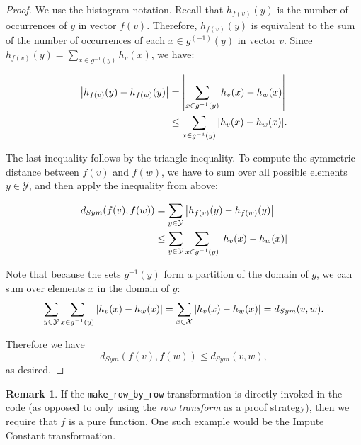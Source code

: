 \documentclass[11pt,a4paper]{article}
\theoremstyle{definition}
\newtheorem{remark}[theorem]{Remark}
\newtheorem{definition}[theorem]{Definition}
\newcommand{\grace}[1]{{ {\color{purple}{(grace)~#1}}}}
\begin{document}
\begin{proof}
    We use the histogram notation. Recall that $h_{f(v)}(y)$ is the number of occurrences of $y$ in vector $f(v)$. Therefore, $h_{f(v)}(y)$ is equivalent to the sum of the number of occurrences of each $x \in g^{(-1)}(y)$ in vector $v$. Since $h_{f(v)}(y) = \sum_{x \in g^{-1}(y)} h_v(x)$, we have:

\begin{align*}
    \abs{h_{f(v)}(y) - h_{f(w)}(y)} &= \abs{\sum_{x \in g^{-1}(y)} h_v(x) - h_w(x)}\\
    &\leq \sum_{x \in g^{-1}(y)} \abs{h_v(x) - h_w(x)}.
\end{align*}

The last inequality follows by the triangle inequality. To compute the symmetric distance between $f(v)$ and $f(w)$, we have to sum over all possible elements $y\in \mathcal{Y}$, and then apply the inequality from above:

\begin{align*}
    d_{Sym}(f(v), f(w)) &= 
    \sum_{y\in\mathcal{Y}} \abs{h_{f(v)}(y) - h_{f(w)}(y)} \\
    &\leq \sum_{y\in\mathcal{Y}}\sum_{x \in g^{-1}(y)} \abs{h_v(x) - h_w(x)}\\
\end{align*}

Note that because the sets $g^{-1}(y)$ form a partition of the domain of $g$, we can sum over elements $x$ in the domain of $g$: $$\sum_{y\in\mathcal{Y}}\sum_{x \in g^{-1}(y)} \abs{h_v(x) - h_w(x)} =
\sum_{x \in \mathcal{X}} \abs{h_{v}(x) - h_{w}(x)} = d_{Sym}(v, w).$$

Therefore we have $$d_{Sym}(f(v), f(w)) \leq d_{Sym}(v, w),$$ as desired.
\end{proof}

\begin{remark}
    If the \texttt{make\_row\_by\_row} transformation is directly invoked in the code (as opposed to only using the \textit{row transform} as a proof strategy), then we require that $f$ is a pure function. One such example would be the Impute Constant transformation.
\end{remark}

\end{document}

